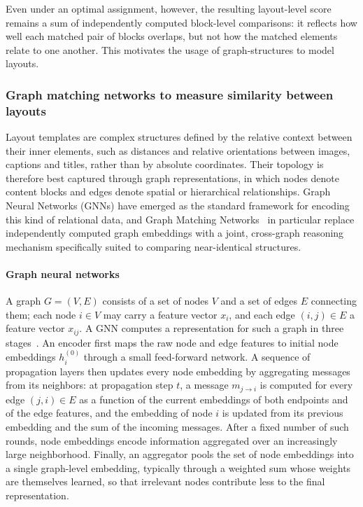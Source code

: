 Even under an optimal assignment, however, the resulting layout-level score remains a sum of independently computed block-level comparisons: it reflects how well each matched pair of blocks overlaps, but not how the matched elements relate to one another. This motivates the usage of graph-structures to model layouts.

\subsubsection{Graph matching networks to measure similarity between layouts}
\label{sec:sota-gmn}

Layout templates are complex structures defined by the relative context between their inner elements, such as distances and relative orientations between images, captions and titles, rather than by absolute coordinates. Their topology is therefore best captured through graph representations, in which nodes denote content blocks and edges denote spatial or hierarchical relationships. Graph Neural Networks (GNNs) have emerged as the standard framework for encoding this kind of relational data, and Graph Matching Networks~\cite{li-gmn-2019} in particular replace independently computed graph embeddings with a joint, cross-graph reasoning mechanism specifically suited to comparing near-identical structures.

\paragraph{Graph neural networks}
A graph $G=(V,E)$ consists of a set of nodes $V$ and a set of edges $E$ connecting them; each node $i \in V$ may carry a feature vector $x_i$, and each edge $(i,j) \in E$ a feature vector $x_{ij}$. A GNN computes a representation for such a graph in three stages~\cite{li-gmn-2019}. An encoder first maps the raw node and edge features to initial node embeddings $h_i^{(0)}$ through a small feed-forward network. A sequence of propagation layers then updates every node embedding by aggregating messages from its neighbors: at propagation step $t$, a message $m_{j\to i}$ is computed for every edge $(j,i)\in E$ as a function of the current embeddings of both endpoints and of the edge features, and the embedding of node $i$ is updated from its previous embedding and the sum of the incoming messages. After a fixed number of such rounds, node embeddings encode information aggregated over an increasingly large neighborhood. Finally, an aggregator pools the set of node embeddings into a single graph-level embedding, typically through a weighted sum whose weights are themselves learned, so that irrelevant nodes contribute less to the final representation.

